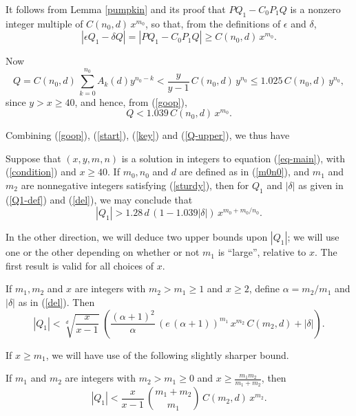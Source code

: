 It follows from Lemma \ref{pumpkin}
and its proof  that $P Q_1 - C_0 P_1 Q$ is a nonzero integer multiple of 
$C(n_0,d) \, x^{m_0}$, so that, from the definitions of $\epsilon$ and $\delta$, 
\begin{equation} \label{key}
|\epsilon Q_1 - \delta Q| = |P Q_1 - C_0 P_1 Q| \geq  C(n_0,d) \, x^{m_0}.
\end{equation}

Now 
$$
Q = C(n_0,d) \,  \sum_{k = 0}^{n_0} A_k (d) y^{n_0-k} < \frac{y}{y-1} \, C(n_0,d) \, y^{n_0} \leq 1.025 \, C(n_0,d) \, y^{n_0},
$$
since $y > x \geq 40$, and hence,
from (\ref{goop}), 
\begin{equation} \label{Q-upper}
Q < 1.039  \, C(n_0,d) \, x^{m_0}.
\end{equation}

Combining (\ref{goop}), (\ref{start}), (\ref{key}) and (\ref{Q-upper}), we thus have
 \begin{proposition} \label{upper-cool}
 Suppose that $(x,y,m,n)$ is a solution in integers to equation (\ref{eq-main}), with (\ref{condition}) and $x \geq 40$. If $m_0, n_0$ and $d$ are defined as in (\ref{m0n0}), and $m_1$ and $m_2$ are nonnegative integers satisfying (\ref{sturdy}), then for $Q_1$ and $|\delta|$ as given  in (\ref{Q1-def}) and (\ref{del}), we may conclude that
 \begin{equation} \label{imp}
  |Q_1| > 1.28 \, d \, (1-1.039 |\delta|) \, x^{m_0+m_0/n_0}.
\end{equation}
 \end{proposition}

In the other direction, we will deduce two upper bounds upon $|Q_1|$; we will use one or the other depending on whether or not $m_1$ is ``large'', relative to $x$. The first result is valid for all choices of $x$.
\begin{proposition} \label{shazam2}
If $m_1, m_2$ and $x$ are integers with $m_2 > m_1 \geq 1$ and $x \geq 2$, define $\alpha = m_2/m_1$ and $|\delta|$ as in (\ref{del}).
Then
\begin{equation} \label{munchkin}
|Q_1| < \sqrt[d]{\frac{x}{x-1}} \; \left( \frac{(\alpha+1)^2}{\alpha} \, (e \, (\alpha + 1))^{m_1}  \, x^{m_2} \, C(m_2,d)
+ |\delta| \right).
\end{equation}
\end{proposition}


If $x \geq m_1$, we will have use of the following slightly sharper bound.
 \begin{proposition} \label{shazam}
If $m_1$ and $m_2$ are integers with $m_2 > m_1 \geq 0$ and $x \geq \frac{m_1m_2}{m_1+m_2}$, then
$$
|Q_1| < \frac{x}{x-1} \, \binom{m_1+m_2}{m_1}  \, C(m_2,d) \, x^{m_2}.
$$
\end{proposition}

